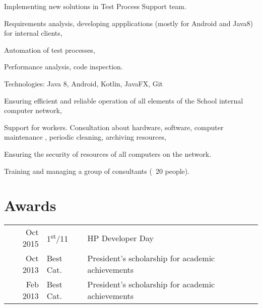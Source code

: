 \documentclass[]{deedy-resume-openfont}
\begin{document}
\begin{minipage}[t]{0.66\textwidth}
Implementing new solutions in Test Process Support team.
\begin{tightemize}
\item Requirements analysis, developing appplications (mostly for Android and Java8) for internal clients,
\item Automation of test processes,
\item Performance analysis, code inspection.
\end{tightemize}
Technologies: Java 8, Android, Kotlin, JavaFX, Git
\sectionsep

\begin{tightemize}
\item Ensuring efficient and reliable operation of all elements of the School internal computer network,
\item Support for workers. Consultation about hardware, software, computer maintenance , periodic cleaning, archiving resources, 
\item Ensuring the security of resources of all computers on the network.
\end{tightemize}
\sectionsep

\begin{tightemize}
\item Training and managing a group of consultants (~20 people).\end{tightemize}
\sectionsep


 \section{Awards} 
 \begin{tabular}{rll}
 Oct 2015	     & 1\textsuperscript{st}/11  & HP Developer Day\\
 Oct 2013	     & Best Cat.  & President’s scholarship for academic achievements \\
 Feb 2013	     & Best Cat.  & President’s scholarship for academic achievements \\
 \end{tabular}
 \sectionsep

\end{minipage} 
\end{document}
